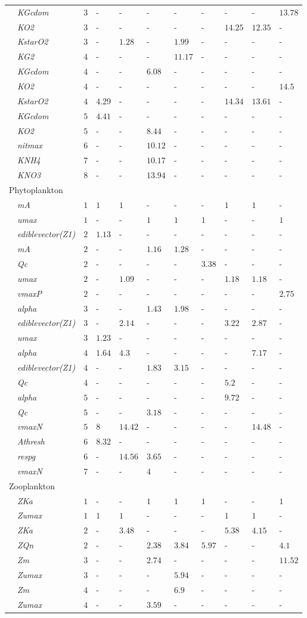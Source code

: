 \documentclass[letterpaper,12pt,oneside]{article}\usepackage[]{graphicx}\usepackage[]{color}
\begin{document}
\begin{table}[!tbp]
{\begin{center}
\begin{tabular}{llllllllll}
~~\footnotesize{\textit{KGcdom}}&$3$&-&-&-&-&-&-&-&$13.78$\tabularnewline
~~\footnotesize{\textit{KO2}}&$3$&-&-&-&-&-&$14.25$&$12.35$&-\tabularnewline
~~\footnotesize{\textit{KstarO2}}&$3$&-&$1.28$&-&$1.99$&-&-&-&-\tabularnewline
~~\footnotesize{\textit{KG2}}&$4$&-&-&-&$11.17$&-&-&-&-\tabularnewline
~~\footnotesize{\textit{KGcdom}}&$4$&-&-&$6.08$&-&-&-&-&-\tabularnewline
~~\footnotesize{\textit{KO2}}&$4$&-&-&-&-&-&-&-&$14.5$\tabularnewline
~~\footnotesize{\textit{KstarO2}}&$4$&$4.29$&-&-&-&-&$14.34$&$13.61$&-\tabularnewline
~~\footnotesize{\textit{KGcdom}}&$5$&$4.41$&-&-&-&-&-&-&-\tabularnewline
~~\footnotesize{\textit{KO2}}&$5$&-&-&$8.44$&-&-&-&-&-\tabularnewline
~~\footnotesize{\textit{nitmax}}&$6$&-&-&$10.12$&-&-&-&-&-\tabularnewline
~~\footnotesize{\textit{KNH4}}&$7$&-&-&$10.17$&-&-&-&-&-\tabularnewline
~~\footnotesize{\textit{KNO3}}&$8$&-&-&$13.94$&-&-&-&-&-\tabularnewline
\hline
{Phytoplankton}&&&&&&&&&\tabularnewline
~~\footnotesize{\textit{mA}}&$1$&$1$&$1$&-&-&-&$1$&$1$&-\tabularnewline
~~\footnotesize{\textit{umax}}&$1$&-&-&$1$&$1$&$1$&-&-&$1$\tabularnewline
~~\footnotesize{\textit{ediblevector(Z1)}}&$2$&$1.13$&-&-&-&-&-&-&-\tabularnewline
~~\footnotesize{\textit{mA}}&$2$&-&-&$1.16$&$1.28$&-&-&-&-\tabularnewline
~~\footnotesize{\textit{Qc}}&$2$&-&-&-&-&$3.38$&-&-&-\tabularnewline
~~\footnotesize{\textit{umax}}&$2$&-&$1.09$&-&-&-&$1.18$&$1.18$&-\tabularnewline
~~\footnotesize{\textit{vmaxP}}&$2$&-&-&-&-&-&-&-&$2.75$\tabularnewline
~~\footnotesize{\textit{alpha}}&$3$&-&-&$1.43$&$1.98$&-&-&-&-\tabularnewline
~~\footnotesize{\textit{ediblevector(Z1)}}&$3$&-&$2.14$&-&-&-&$3.22$&$2.87$&-\tabularnewline
~~\footnotesize{\textit{umax}}&$3$&$1.23$&-&-&-&-&-&-&-\tabularnewline
~~\footnotesize{\textit{alpha}}&$4$&$1.64$&$4.3$&-&-&-&-&$7.17$&-\tabularnewline
~~\footnotesize{\textit{ediblevector(Z1)}}&$4$&-&-&$1.83$&$3.15$&-&-&-&-\tabularnewline
~~\footnotesize{\textit{Qc}}&$4$&-&-&-&-&-&$5.2$&-&-\tabularnewline
~~\footnotesize{\textit{alpha}}&$5$&-&-&-&-&-&$9.72$&-&-\tabularnewline
~~\footnotesize{\textit{Qc}}&$5$&-&-&$3.18$&-&-&-&-&-\tabularnewline
~~\footnotesize{\textit{vmaxN}}&$5$&$8$&$14.42$&-&-&-&-&$14.48$&-\tabularnewline
~~\footnotesize{\textit{Athresh}}&$6$&$8.32$&-&-&-&-&-&-&-\tabularnewline
~~\footnotesize{\textit{respg}}&$6$&-&$14.56$&$3.65$&-&-&-&-&-\tabularnewline
~~\footnotesize{\textit{vmaxN}}&$7$&-&-&$4$&-&-&-&-&-\tabularnewline
\hline
{Zooplankton}&&&&&&&&&\tabularnewline
~~\footnotesize{\textit{ZKa}}&$1$&-&-&$1$&$1$&$1$&-&-&$1$\tabularnewline
~~\footnotesize{\textit{Zumax}}&$1$&$1$&$1$&-&-&-&$1$&$1$&-\tabularnewline
~~\footnotesize{\textit{ZKa}}&$2$&-&$3.48$&-&-&-&$5.38$&$4.15$&-\tabularnewline
~~\footnotesize{\textit{ZQn}}&$2$&-&-&$2.38$&$3.84$&$5.97$&-&-&$4.1$\tabularnewline
~~\footnotesize{\textit{Zm}}&$3$&-&-&$2.74$&-&-&-&-&$11.52$\tabularnewline
~~\footnotesize{\textit{Zumax}}&$3$&-&-&-&$5.94$&-&-&-&-\tabularnewline
~~\footnotesize{\textit{Zm}}&$4$&-&-&-&$6.9$&-&-&-&-\tabularnewline
~~\footnotesize{\textit{Zumax}}&$4$&-&-&$3.59$&-&-&-&-&-\tabularnewline
\hline
\end{tabular}\end{center}}

\end{table}
\end{document}
